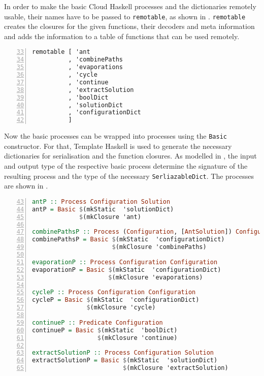 In order to make the basic \textsf{Cloud Haskell} processes and the dictionaries remotely usable, their names have to be passed to \texttt{remotable}, as shown in . \texttt{remotable} creates the closures for the given functions, their decoders and meta information and adds the information to a table of functions that can be used remotely.

\begin{lstlisting}[language=Haskell,frame=tb,numbers=left,firstnumber=33,label=lst:ant_remotable,caption=Making processes and dictionaries remotable.]
remotable [ 'ant
          , 'combinePaths
          , 'evaporations
          , 'cycle
          , 'continue
          , 'extractSolution
          , 'boolDict
          , 'solutionDict
          , 'configurationDict
          ]
\end{lstlisting}

Now the basic processes can be wrapped into processes using the \texttt{Basic} constructor. For that, \textsf{Template Haskell} is used to generate the necessary dictionaries for serialisation and the function closures. As modelled in , the input and output type of the respective basic process determine the signature of the resulting process and the type of the necessary \texttt{SerliazableDict}. The processes are shown in .

\begin{lstlisting}[language=Haskell,frame=tb,numbers=left,firstnumber=43,label=lst:ant_hive,caption={Processes, built up from previously defined basic processes.}, basicstyle=\footnotesize\ttfamily]
antP :: Process Configuration Solution
antP = Basic $(mkStatic  'solutionDict) 
             $(mkClosure 'ant)

combinePathsP :: Process (Configuration, [AntSolution]) Configuration
combinePathsP = Basic $(mkStatic  'configurationDict)
                      $(mkClosure 'combinePaths)

evaporationP :: Process Configuration Configuration
evaporationP = Basic $(mkStatic  'configurationDict)
                     $(mkClosure 'evaporations)

cycleP :: Process Configuration Configuration
cycleP = Basic $(mkStatic  'configurationDict)
               $(mkClosure 'cycle)

continueP :: Predicate Configuration
continueP = Basic $(mkStatic  'boolDict)
                  $(mkClosure 'continue)

extractSolutionP :: Process Configuration Solution
extractSolutionP = Basic $(mkStatic  'solutionDict)
                         $(mkClosure 'extractSolution)
\end{lstlisting}

